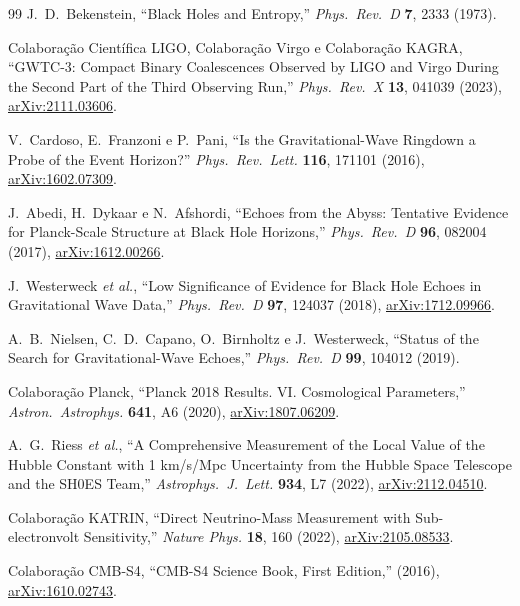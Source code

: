 \documentclass[12pt,a4paper,twocolumn]{article}
\begin{document}
\begin{thebibliography}{99}
J.~D.~Bekenstein,
``Black Holes and Entropy,''
\textit{Phys.~Rev.~D} \textbf{7}, 2333 (1973).

Colaboração Científica LIGO, Colaboração Virgo e Colaboração KAGRA,
``GWTC-3: Compact Binary Coalescences Observed by LIGO and Virgo During the Second Part of the Third Observing Run,''
\textit{Phys.~Rev.~X} \textbf{13}, 041039 (2023),
\href{https://arxiv.org/abs/2111.03606}{arXiv:2111.03606}.

V.~Cardoso, E.~Franzoni e P.~Pani,
``Is the Gravitational-Wave Ringdown a Probe of the Event Horizon?''
\textit{Phys.~Rev.~Lett.} \textbf{116}, 171101 (2016),
\href{https://arxiv.org/abs/1602.07309}{arXiv:1602.07309}.

J.~Abedi, H.~Dykaar e N.~Afshordi,
``Echoes from the Abyss: Tentative Evidence for Planck-Scale Structure at Black Hole Horizons,''
\textit{Phys.~Rev.~D} \textbf{96}, 082004 (2017),
\href{https://arxiv.org/abs/1612.00266}{arXiv:1612.00266}.

J.~Westerweck \textit{et al.},
``Low Significance of Evidence for Black Hole Echoes in Gravitational Wave Data,''
\textit{Phys.~Rev.~D} \textbf{97}, 124037 (2018),
\href{https://arxiv.org/abs/1712.09966}{arXiv:1712.09966}.

A.~B.~Nielsen, C.~D.~Capano, O.~Birnholtz e J.~Westerweck,
``Status of the Search for Gravitational-Wave Echoes,''
\textit{Phys.~Rev.~D} \textbf{99}, 104012 (2019).

Colaboração Planck,
``Planck 2018 Results. VI. Cosmological Parameters,''
\textit{Astron.~Astrophys.} \textbf{641}, A6 (2020),
\href{https://arxiv.org/abs/1807.06209}{arXiv:1807.06209}.

A.~G.~Riess \textit{et al.},
``A Comprehensive Measurement of the Local Value of the Hubble Constant with 1 km/s/Mpc Uncertainty from the Hubble Space Telescope and the SH0ES Team,''
\textit{Astrophys.~J.~Lett.} \textbf{934}, L7 (2022),
\href{https://arxiv.org/abs/2112.04510}{arXiv:2112.04510}.

Colaboração KATRIN,
``Direct Neutrino-Mass Measurement with Sub-electronvolt Sensitivity,''
\textit{Nature Phys.} \textbf{18}, 160 (2022),
\href{https://arxiv.org/abs/2105.08533}{arXiv:2105.08533}.

Colaboração CMB-S4,
``CMB-S4 Science Book, First Edition,''
(2016),
\href{https://arxiv.org/abs/1610.02743}{arXiv:1610.02743}.


\end{thebibliography}
\end{document}
